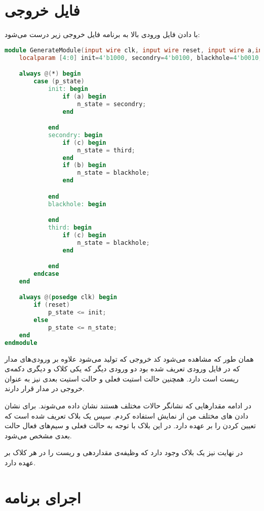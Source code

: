\documentclass[]{article}
\begin{document}
\section*{فایل خروجی}
با دادن فایل ورودی بالا به برنامه فایل خروجی زیر درست می‌شود:
\begin{latin}
\begin{lstlisting}[language=verilog]
module GenerateModule(input wire clk, input wire reset, input wire a,input wire b,input wire c, output reg n_state, output reg p_state);
	localparam [4:0] init=4'b1000, secondry=4'b0100, blackhole=4'b0010, third=4'b0001;

	always @(*) begin
		case (p_state)
			init: begin
				if (a) begin
					n_state = secondry;
				end

			end
			secondry: begin
				if (c) begin
					n_state = third;
				end
				if (b) begin
					n_state = blackhole;
				end

			end
			blackhole: begin

			end
			third: begin
				if (c) begin
					n_state = blackhole;
				end

			end
		endcase
	end

	always @(posedge clk) begin
		if (reset)
			p_state <= init;
		else
			p_state <= n_state;
	end
endmodule
\end{lstlisting}
\end{latin}
همان طور که مشاهده می‌شود کد خروجی که تولید می‌شود علاوه بر ورودی‌های مدار که در فایل ورودی
تعریف شده بود دو ورودی دیگر که یکی کلاک و دیگری دکمه‌ی ریست است دارد.
همچنین حالت استیت فعلی و حالت استیت بعدی نیز به عنوان خروجی در مدار قرار دارند.

در ادامه مقدار‌هایی که نشانگر حالات مختلف هستند نشان داده می‌شوند. برای نشان دادن
های
مختلف من از نمایش
استفاده کردم.
سپس یک بلاک
تعریف شده است که تعیین کردن
را بر عهده دارد. در این بلاک با توجه به حالت فعلی و سیم‌های فعال حالت بعدی مشخص می‌شود.

در نهایت نیز یک بلاک
وجود دارد که وظیفه‌ی مقداردهی
 و ریست
را در هر کلاک بر عهده دارد.

\section*{اجرای برنامه}
\end{document}
